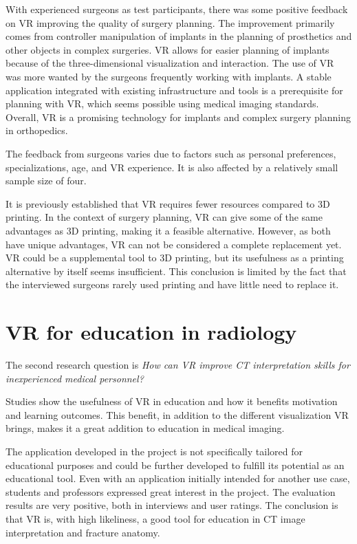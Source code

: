 \documentclass[a4paper]{report}
\begin{document}
With experienced surgeons as test participants, there was some positive feedback on VR improving the quality of surgery planning. The improvement primarily comes from controller manipulation of implants in the planning of prosthetics and other objects in complex surgeries. VR allows for easier planning of implants because of the three-dimensional visualization and interaction. The use of VR was more wanted by the surgeons frequently working with implants.
A stable application integrated with existing infrastructure and tools is a prerequisite for planning with VR, which seems possible using medical imaging standards.
Overall, VR is a promising technology for implants and complex surgery planning in orthopedics.

The feedback from surgeons varies due to factors such as personal preferences, specializations, age, and VR experience. It is also affected by a relatively small sample size of four.

It is previously established that VR requires fewer resources compared to 3D printing. In the context of surgery planning, VR can give some of the same advantages as 3D printing, making it a feasible alternative. However, as both have unique advantages, VR can not be considered a complete replacement yet. VR could be a supplemental tool to 3D printing, but its usefulness as a printing alternative by itself seems insufficient. This conclusion is limited by the fact that the interviewed surgeons rarely used printing and have little need to replace it.

\section{VR for education in radiology}

The second research question is \emph{How can VR improve CT interpretation skills for inexperienced medical personnel?}

Studies show the usefulness of VR in education and how it benefits motivation and learning outcomes. This benefit, in addition to the different visualization VR brings, makes it a great addition to education in medical imaging.

The application developed in the project is not specifically tailored for educational purposes and could be further developed to fulfill its potential as an educational tool.
Even with an application initially intended for another use case, students and professors expressed great interest in the project. The evaluation results are very positive, both in interviews and user ratings.
The conclusion is that VR is, with high likeliness, a good tool for education in CT image interpretation and fracture anatomy.
\end{document}
